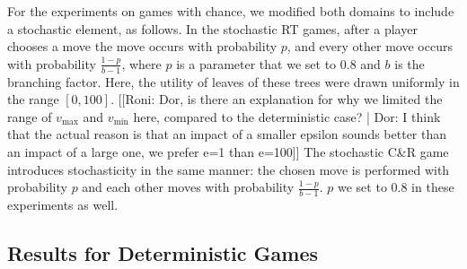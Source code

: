 \documentclass[letterpaper]{article} %
\newcommand{\vmax}{v_{\text{max}}}
\newcommand{\vmin}{v_{\text{min}}}
\begin{document}

For the experiments on games with chance, we modified both domains to include a stochastic element, as follows. In the stochastic RT games, after a player chooses a move the move occurs with probability $p$, and every other move occurs with probability $\frac{1-p}{b-1}$, where $p$ is a parameter that we set to $0.8$ and $b$ is the branching factor. Here, the utility of leaves of these trees were drawn uniformly in the range $[0, 100]$. [[Roni: Dor, is there an explanation for why we limited the range of $\vmax$ and $\vmin$ here, compared to the deterministic case? | Dor: I think that the actual reason is that an impact of a smaller epsilon sounds better than an impact of a large one, we prefer e=1 than e=100]]
The stochastic C\&R game introduces stochasticity in the same manner: the chosen move is performed with probability $p$ and each other moves with probability $\frac{1-p}{b-1}$. $p$ we set to 0.8 in these experiments as well. 



\subsection{Results for Deterministic Games}

\end{document}

